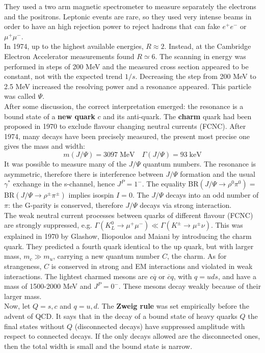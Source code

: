 \documentclass[10.75pt,a4paper,openright,bottom=2cm]{article}
\begin{document}
They used a two arm magnetic spectrometer to measure separately the electrons and the positrons. Leptonic events are rare, so they used very intense beams in order to have an high rejection power to reject hadrons that can fake $e^+e^-$ or $\mu^+\mu^-$.\\ In 1974, up to the highest available energies, $R\approx2$. Instead, at the Cambridge Electron Accelerator measurements found $R\simeq6$. The scanning in energy was performed in steps of 200 MeV and the measured cross section appeared to be constant, not with the expected trend $1/s$. Decreasing the step from 200 MeV to 2.5 MeV increased the resolving power and a resonance appeared. This particle was called $\Psi$.\\
After some discussion, the correct interpretation emerged: the resonance is a bound state of a \textbf{new quark} $c$ and its anti-quark. The \textbf{charm} quark had been proposed in 1970 to exclude flavour changing neutral currents (FCNC). After 1974, many decays have been precisely measured, the present most precise one gives the mass and width:
\[
m(J/\Psi)=3097\;\text{MeV} \quad \Gamma(J/\Psi)=93\;\text{keV}
\]
It was possible to measure many of the $J/\Psi$ quantum numbers. The resonance is asymmetric, therefore there is interference between $J/\Psi$ formation and the usual $\gamma^*$ exchange in the s-channel, hence $J^P=1^-$. The equality BR$(J/\Psi\to\rho^0\pi^0)=$BR$(J/\Psi\to\rho^\pm\pi^\pm)$ implies isospin $I=0$. The $J/\Psi$ decays into an odd number of $\pi$: the G-parity is conserved, therefore $J/\Psi$ decays via strong interaction.\\
The weak neutral current processes between quarks of different flavour (FCNC) are strongly suppressed, e.g. $\Gamma(K_L^0\to\mu^+\mu^-)\ll\Gamma(K^\pm\to\mu^\pm\nu)$. This was explained in 1970 by Glashow, Iliopoulos and Maiani by introducing the charm quark. They predicted a fourth quark identical to the up quark, but with larger mass, $m_c\gg m_u$, carrying a new quantum number $C$, the charm. As for strangeness, $C$ is conserved in strong and EM interactions and violated in weak interactions. The lightest charmed mesons are $c\overline{q}$ or $\overline{c}q$, with $q=uds$, and have a mass of 1500-2000 MeV and $J^P=0^-$. These mesons decay weakly because of their larger mass.\\
Now, let $Q=s,c$ and $q=u,d$. The \textbf{Zweig rule} was set empirically before the advent of QCD. It says that in the decay of a bound state of heavy quarks $Q$ the final states without $Q$ (disconnected decays) have suppressed amplitude with respect to connected decays. If the only decays allowed are the disconnected ones, then the total width is small and the bound state is narrow.\\
\end{document}
